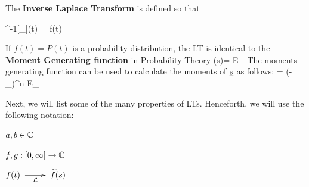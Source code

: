 The {\bf Inverse
Laplace Transform}
is defined so that

\beq \call^{-1}[\underbrace{\call[f]}_{}](t)
= f(t)
\eeq



If $f(t)=P(t)$
is a probability
distribution,
the LT 
is identical
to the 
{\bf Moment Generating function} in Probability Theory
\beq
\call[P](s)= E_\rvt[e^{-s\rvt}]
\eeq
The moments
generating function
can be used 
to calculate 
the moments of ${\underline{s}}$ as follows:
\beq
{} = (-\partial_\rvs)^n E_\rvt[e^{-s\rvt}]
\eeq

Next, we 
will list
some of the
many
properties of 
LTs.
Henceforth,
we will
use the following
notation:

$a, b\in{ \mathbb{C}}$

$f,g:[0,\infty]\rightarrow { \mathbb{C}}$

$f(t)\maparrow{\call} \TIL{f}(s)$



